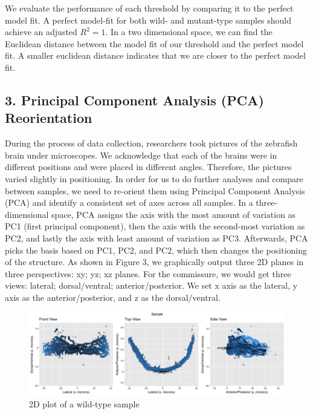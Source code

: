 \documentclass[10pt,letterpaper]{article}
\begin{document}
We evaluate the performance of each threshold by comparing it to the
perfect model fit. A perfect model-fit for both wild- and mutant-type
samples should achieve an adjusted \(R^2 = 1\). In a two dimensional
space, we can find the Euclidean distance between the model fit of our
threshold and the perfect model fit. A smaller euclidean distance
indicates that we are closer to the perfect model fit.

\hypertarget{principal-component-analysis-pca-reorientation}{%
\subsection{3. Principal Component Analysis (PCA)
Reorientation}\label{principal-component-analysis-pca-reorientation}}

During the process of data collection, researchers took pictures of the
zebrafish brain under microscopes. We acknowledge that each of the
brains were in different positions and were placed in different angles.
Therefore, the pictures varied slightly in positioning. In order for us
to do further analyses and compare between samples, we need to re-orient
them using Principal Component Analysis (PCA) and identify a consistent
set of axes across all samples. In a three-dimensional space, PCA
assigns the axis with the most amount of variation as PC1 (first
principal component), then the axis with the second-most variation as
PC2, and lastly the axis with least amount of variation as PC3.
Afterwards, PCA picks the basis based on PC1, PC2, and PC2, which then
changes the positioning of the structure. As shown in Figure 3, we
graphically output three 2D planes in three perspectives: xy; yz; xz
planes. For the commissure, we would get three views: lateral;
dorsal/ventral; anterior/posterior. We set x axis as the lateral, y axis
as the anterior/posterior, and z as the dorsal/ventral.

\begin{figure}[H]
\includegraphics[width=0.9\linewidth]{visualization_paper/wt_04} \caption{2D plot of a wild-type sample}\label{fig:Figure3}
\end{figure}
\end{document}
